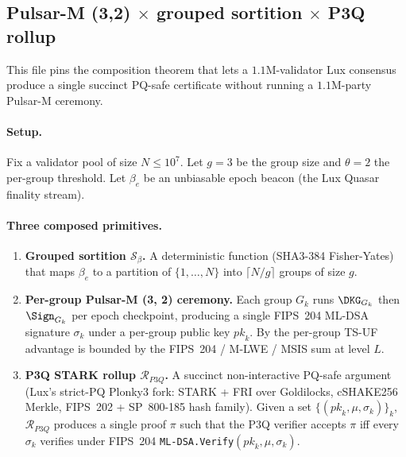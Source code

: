 
\subsection*{Pulsar-M (3,2) $\times$ grouped sortition $\times$ P3Q rollup}

This file pins the composition theorem that lets a $1.1$M-validator
Lux consensus produce a single succinct PQ-safe certificate without
running a $1.1$M-party Pulsar-M ceremony.

\paragraph{Setup.}
Fix a validator pool of size $N \le 10^7$. Let $g = 3$ be the group
size and $\theta = 2$ the per-group threshold. Let $\beta_e$ be an
unbiasable epoch beacon (the Lux Quasar finality stream).

\paragraph{Three composed primitives.}

\begin{enumerate}[leftmargin=*, itemsep=0pt]
\item \textbf{Grouped sortition $\mathcal{S}_\beta$.} A deterministic
function (SHA3-384 Fisher-Yates) that maps $\beta_e$ to a partition
of $\{1, \dots, N\}$ into $\lceil N / g \rceil$ groups of size $g$.
\item \textbf{Per-group Pulsar-M (3, 2) ceremony.} Each group $G_k$
runs $\DKG_{G_k}$ then $\Sign_{G_k}$ per epoch checkpoint, producing
a single FIPS~204 ML-DSA signature $\sigma_k$ under a per-group
public key $\mathit{pk}_k$. By
 the per-group TS-UF advantage is bounded
by the FIPS~204 / M-LWE / MSIS sum at level $L$.
\item \textbf{P3Q STARK rollup $\mathcal{R}_{P3Q}$.} A succinct
non-interactive PQ-safe argument (Lux's strict-PQ Plonky3 fork:
STARK + FRI over Goldilocks, cSHAKE256 Merkle, FIPS~202 +
SP~800-185 hash family). Given a set $\{(\mathit{pk}_k, \mu, \sigma_k)\}_k$,
$\mathcal{R}_{P3Q}$ produces a single proof $\pi$ such that the P3Q
verifier accepts $\pi$ iff every $\sigma_k$ verifies under FIPS~204
\texttt{ML-DSA.Verify}$(\mathit{pk}_k, \mu, \sigma_k)$.
\end{enumerate}


